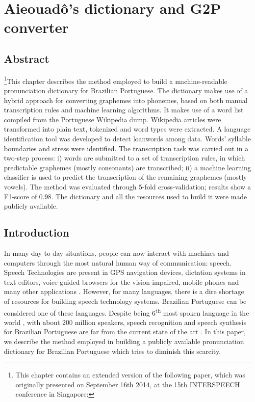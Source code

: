 \chapter{Aieouad\^o's dictionary and G2P converter}\label{ch:aieouado-g2p}

\section*{Abstract}

\footnote{This chapter contains an extended version of the following paper, which was originally presented on September 16th 2014, at the 15th INTERSPEECH conference in Singapore: }This chapter describes the method employed to build a machine-readable 
pronunciation 
dictionary for Brazilian Portuguese. The dictionary makes use of a hybrid approach for
converting graphemes into phonemes, based on both manual transcription rules and machine
learning algorithms. It makes use of a word list compiled from the Portuguese
Wikipedia dump. Wikipedia articles were transformed into plain text, tokenized and 
word types were extracted. A language identification tool was developed to detect 
loanwords among data. Words' syllable boundaries and stress were identified.
The transcription task was carried out in a two-step process: i) words are submitted
to a set of transcription rules, in which predictable graphemes (mostly consonants)
are transcribed; ii) a machine learning classifier is used to predict the transcription of the 
remaining graphemes (mostly vowels). The method was evaluated through 5-fold cross-validation; 
results show a F1-score of 0.98. The dictionary and all the resources used to build it 
were made publicly available.

\section{Introduction}

In many day-to-day situations, people can now interact with machines and computers through the
most natural human way of communication: speech. Speech Technologies are present in GPS navigation devices, dictation
systems in text editors, voice-guided browsers for the vision-impaired, mobile phones and many other applications \cite{Godwin2009}. 
However, for many languages, there is a dire shortage of resources for building speech technology systems. 
Brazilian Portuguese can be considered one of these languages. Despite being 6\textsuperscript{th} most
spoken language in the world \cite{Ethnologue2013}, with about 200 million speakers, speech recognition and speech 
synthesis for Brazilian Portuguese are far from the current state of the art \cite{Neto2011}. In this paper, we describe the method 
employed in building a publicly available pronunciation dictionary for Brazilian Portuguese which tries to
diminish this scarcity. 


